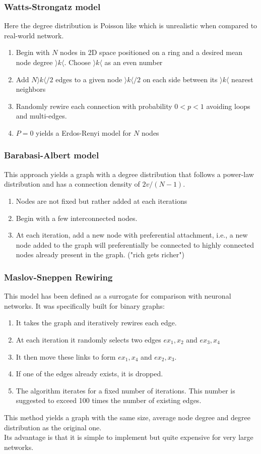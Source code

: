 \subsubsection{Watts-Strongatz model}
Here the degree distribution is Poisson like which is unrealistic when compared to real-world network.
\begin{enumerate}
    \item Begin with \(N\) nodes in 2D space positioned on a ring and a desired mean node degree \(\rangle k\langle\). Choose \(\rangle k\langle\) as an even number
    \item Add \(N\rangle k\langle/2\) edges to a given node \(\rangle k\langle/2\) on each side between its \(\rangle k\langle\) nearest neighbors
    \item Randomly rewire each connection with probability \(0<p<1\) avoiding loops and multi-edges.
    \item \(P=0\) yields a Erdos-Renyi model for \(N\) nodes
\end{enumerate}
\subsubsection{Barabasi-Albert model}
This approach yields a graph with a degree distribution that follows a power-law distribution and has a connection density of \(2v/(N-1)\).
\begin{enumerate}
    \item Nodes are not fixed but rather added at each iterations
    \item Begin with a few interconnected nodes.
    \item At each iteration, add a new node with preferential attachment, i.e., a new node added to the graph will preferentially be connected to highly connected nodes already present in the graph. ("rich gets richer")
\end{enumerate}
\subsubsection{Maslov-Sneppen Rewiring}
This model has been defined as a surrogate for comparison with neuronal networks. It was specifically built for binary graphs:
\begin{enumerate}
    \item It takes the graph and iteratively rewires each edge.
    \item At each iteration it randomly selects two edges \(e{x_1,x_2}\) and \(e{x_3,x_4}\)
    \item It then move these links to form \(e{x_1,x_4}\) and \(e{x_2,x_3}\).
    \item If one of the edges already exists, it is dropped.
    \item The algorithm iterates for a fixed number of iterations. This number is suggested to exceed 100 times the number of existing edges.
\end{enumerate}
This method yields a graph with the same size, average node degree and degree distribution as the original one.\\
Its advantage is that it is simple to implement but quite expensive for very large networks.
